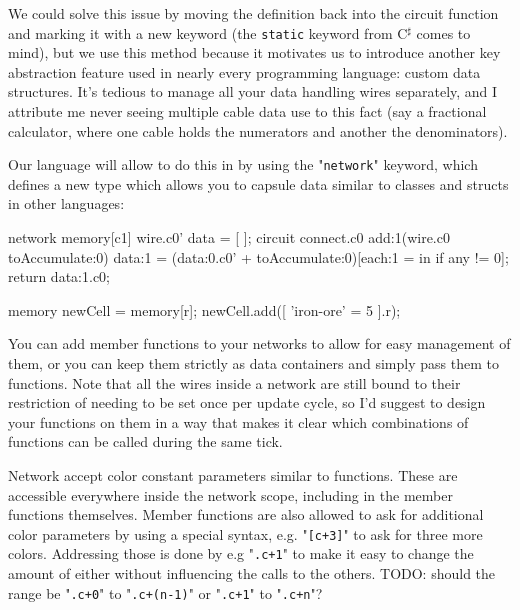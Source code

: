 \documentclass[landscape]{article}
\theoremstyle{plain}
\theoremstyle{definition}
\begin{document}
We could solve this issue by moving the definition back into the circuit function and marking it with a new keyword (the \texttt{static} keyword from C$^\sharp$ comes to mind), but we use this method because it motivates us to introduce another key abstraction feature used in nearly every programming language: custom data structures. It's tedious to manage all your data handling wires separately, and I attribute me never seeing multiple cable data use to this fact (say a fractional calculator, where one cable holds the numerators and another the denominators).

Our language will allow to do this in by using the "\texttt{network}" keyword, which defines a new type which allows you to capsule data similar to classes and structs in other languages:
\begin{langname}
network memory[c1]
{
  wire.c0' data = [ ];
  circuit connect.c0 add:1(wire.c0 toAccumulate:0)
  {
    data:1 = (data:0.c0' + toAccumulate:0)[each:1 = in if any != 0];
    return data:1.c0;
  }
}

memory newCell = memory[r];
newCell.add([ 'iron-ore' = 5 ].r);
\end{langname}
You can add member functions to your networks to allow for easy management of them, or you can keep them strictly as data containers and simply pass them to functions. Note that all the wires inside a network are still bound to their restriction of needing to be set once per update cycle, so I'd suggest to design your functions on them in a way that makes it clear which combinations of functions can be called during the same tick.

Network accept color constant parameters similar to functions. These are accessible everywhere inside the network scope, including in the member functions themselves. Member functions are also allowed to ask for additional color parameters by using a special syntax, e.g. "\texttt{[c+3]}" to ask for three more colors. Addressing those is done by e.g "\texttt{.c+1}" to make it easy to change the amount of either without influencing the calls to the others. TODO: should the range be "\texttt{.c+0}" to "\texttt{.c+(n-1)}" or "\texttt{.c+1}" to "\texttt{.c+n}"?
\end{document}
